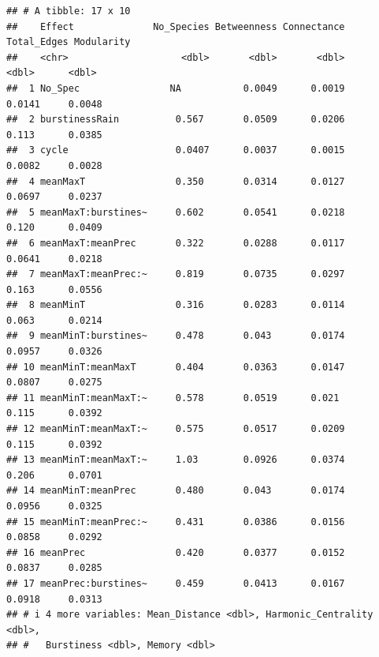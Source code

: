 \documentclass[
]{article}
\begin{document}
\begin{verbatim}
## # A tibble: 17 x 10
##    Effect              No_Species Betweenness Connectance Total_Edges Modularity
##    <chr>                    <dbl>       <dbl>       <dbl>       <dbl>      <dbl>
##  1 No_Spec                NA           0.0049      0.0019      0.0141     0.0048
##  2 burstinessRain          0.567       0.0509      0.0206      0.113      0.0385
##  3 cycle                   0.0407      0.0037      0.0015      0.0082     0.0028
##  4 meanMaxT                0.350       0.0314      0.0127      0.0697     0.0237
##  5 meanMaxT:burstines~     0.602       0.0541      0.0218      0.120      0.0409
##  6 meanMaxT:meanPrec       0.322       0.0288      0.0117      0.0641     0.0218
##  7 meanMaxT:meanPrec:~     0.819       0.0735      0.0297      0.163      0.0556
##  8 meanMinT                0.316       0.0283      0.0114      0.063      0.0214
##  9 meanMinT:burstines~     0.478       0.043       0.0174      0.0957     0.0326
## 10 meanMinT:meanMaxT       0.404       0.0363      0.0147      0.0807     0.0275
## 11 meanMinT:meanMaxT:~     0.578       0.0519      0.021       0.115      0.0392
## 12 meanMinT:meanMaxT:~     0.575       0.0517      0.0209      0.115      0.0392
## 13 meanMinT:meanMaxT:~     1.03        0.0926      0.0374      0.206      0.0701
## 14 meanMinT:meanPrec       0.480       0.043       0.0174      0.0956     0.0325
## 15 meanMinT:meanPrec:~     0.431       0.0386      0.0156      0.0858     0.0292
## 16 meanPrec                0.420       0.0377      0.0152      0.0837     0.0285
## 17 meanPrec:burstines~     0.459       0.0413      0.0167      0.0918     0.0313
## # i 4 more variables: Mean_Distance <dbl>, Harmonic_Centrality <dbl>,
## #   Burstiness <dbl>, Memory <dbl>
\end{verbatim}
\end{document}
